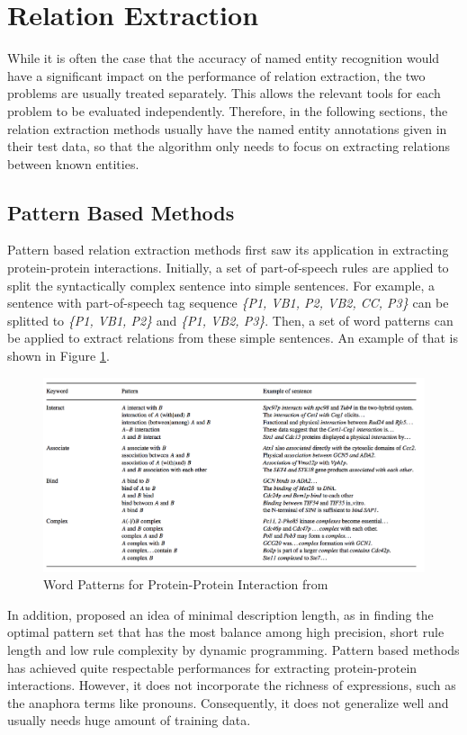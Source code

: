 \section{Relation Extraction}%
While it is often the case that the accuracy of named entity recognition would have a significant impact on the performance of relation extraction, the two problems are usually treated separately. This allows the relevant tools for each problem to be evaluated independently. Therefore, in the following sections, the relation extraction methods usually have the named entity annotations given in their test data, so that the algorithm only needs to focus on extracting relations between known entities.
\subsection{Pattern Based Methods}
Pattern based relation extraction methods first saw its application in extracting protein-protein interactions\cite{hao2005discovering}. Initially, a set of part-of-speech rules are applied to split the syntactically complex sentence into simple sentences. For example, a sentence with part-of-speech tag sequence \emph{\big\{P1, VB1, P2, VB2, CC, P3\big\}} can be splitted to \emph{\big\{P1, VB1, P2\big\}} and \emph{\big\{P1, VB2, P3\big\}}. Then, a set of word patterns can be applied to extract relations from these simple sentences\cite{ono2001automated}. An example of that is shown in Figure \ref{fig:Word_Patterns}. 
	\begin{figure}[h]
		\centering
		\includegraphics[width=\textwidth]{Word_Patterns}
		\caption{Word Patterns for Protein-Protein Interaction from \citet*{ono2001automated}}
		\label{fig:Word_Patterns}   
	\end{figure}
In addition, \citet{hao2005discovering} proposed an idea of minimal description length, as in finding the optimal pattern set that has the most balance among high precision, short rule length and low rule complexity by dynamic programming. Pattern based methods has achieved quite respectable performances for extracting protein-protein interactions\cite{hao2005discovering}. However, it does not incorporate the richness of expressions, such as the anaphora terms like pronouns. Consequently, it does not generalize well and usually needs huge amount of training data.
